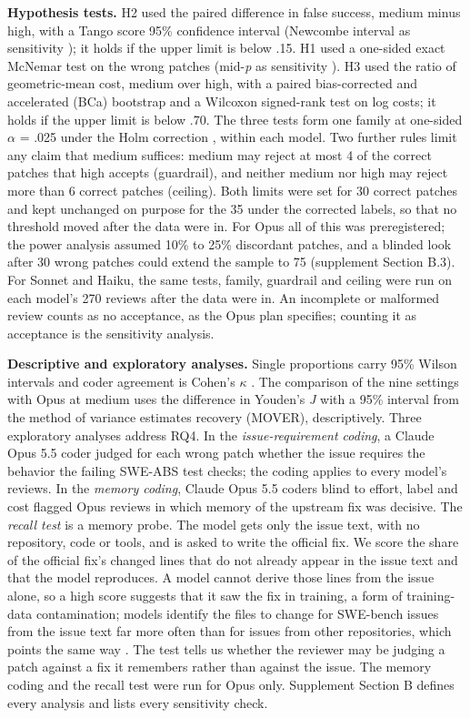 \documentclass[sigconf,nonacm]{acmart}
\begin{document}
\textbf{Hypothesis tests.} H2 used the paired difference in false success, medium minus high, with a Tango score 95\% confidence interval \cite{tango1998equivalence} (Newcombe interval as sensitivity \cite{newcombe1998paired}); it holds if the upper limit is below .15. H1 used a one-sided exact McNemar test on the wrong patches \cite{mcnemar1947} (mid-\textit{p} as sensitivity \cite{fagerland2013mcnemar}). H3 used the ratio of geometric-mean cost, medium over high, with a paired bias-corrected and accelerated (BCa) bootstrap \cite{efron1987bca} and a Wilcoxon signed-rank test \cite{wilcoxon1945} on log costs; it holds if the upper limit is below .70. The three tests form one family at one-sided $\alpha$ = .025 under the Holm correction \cite{holm1979sequential}, within each model. Two further rules limit any claim that medium suffices: medium may reject at most 4 of the correct patches that high accepts (guardrail), and neither medium nor high may reject more than 6 correct patches (ceiling). Both limits were set for 30 correct patches and kept unchanged on purpose for the 35 under the corrected labels, so that no threshold moved after the data were in. For Opus all of this was preregistered; the power analysis assumed 10\% to 25\% discordant patches, and a blinded look after 30 wrong patches could extend the sample to 75 (supplement Section B.3). For Sonnet and Haiku, the same tests, family, guardrail and ceiling were run on each model's 270 reviews after the data were in. An incomplete or malformed review counts as no acceptance, as the Opus plan specifies; counting it as acceptance is the sensitivity analysis.

\textbf{Descriptive and exploratory analyses.} Single proportions carry 95\% Wilson intervals \cite{wilson1927} and coder agreement is Cohen's $\kappa$ \cite{cohen1960kappa}. The comparison of the nine settings with Opus at medium uses the difference in Youden's \textit{J} with a 95\% interval from the method of variance estimates recovery (MOVER), descriptively. Three exploratory analyses address RQ4. In the \textit{issue-requirement coding}, a Claude Opus 5.5 coder judged for each wrong patch whether the issue requires the behavior the failing SWE-ABS test checks; the coding applies to every model's reviews. In the \textit{memory coding}, Claude Opus 5.5 coders blind to effort, label and cost flagged Opus reviews in which memory of the upstream fix was decisive. The \textit{recall test} is a memory probe. The model gets only the issue text, with no repository, code or tools, and is asked to write the official fix. We score the share of the official fix's changed lines that do not already appear in the issue text and that the model reproduces. A model cannot derive those lines from the issue alone, so a high score suggests that it saw the fix in training, a form of training-data contamination; models identify the files to change for SWE-bench issues from the issue text far more often than for issues from other repositories, which points the same way \cite{liang2025illusion}. The test tells us whether the reviewer may be judging a patch against a fix it remembers rather than against the issue. The memory coding and the recall test were run for Opus only. Supplement Section B defines every analysis and lists every sensitivity check.
\end{document}
